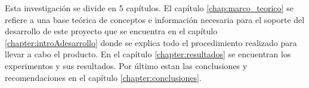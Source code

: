 


Esta investigaci\'on se divide en 5 cap\'itulos. El cap\'itulo \ref{chap:marco_teorico} se refiere a una base te\'orica de conceptos e informaci\'on necesaria para el soporte del desarrollo de este proyecto que se encuentra en el cap\'itulo  \ref{chapter:introAdesarrollo} donde se explica todo el procedimiento realizado para llevar a cabo el producto. En el cap\'itulo \ref{chapter:resultados} se encuentran  los experimentos y sus resultados. Por \'ultimo estan las conclusiones y recomendaciones en el capítulo \ref{chapter:conclusiones}. 